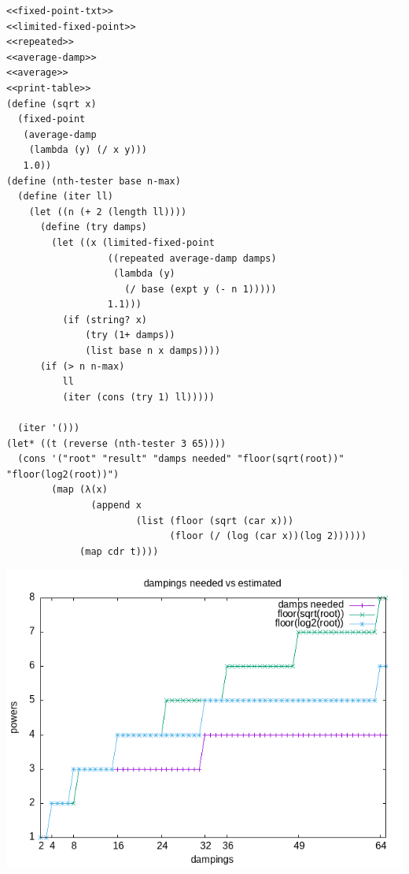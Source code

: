 \documentclass[final,fleqn,titlepage]{article}
\begin{document}
\begin{verbatim}
<<fixed-point-txt>>
<<limited-fixed-point>>
<<repeated>>
<<average-damp>>
<<average>>
<<print-table>>
(define (sqrt x)
  (fixed-point
   (average-damp
    (lambda (y) (/ x y)))
   1.0))
(define (nth-tester base n-max)
  (define (iter ll)
    (let ((n (+ 2 (length ll))))
      (define (try damps)
        (let ((x (limited-fixed-point
                  ((repeated average-damp damps)
                   (lambda (y)
                     (/ base (expt y (- n 1)))))
                  1.1)))
          (if (string? x)
              (try (1+ damps))
              (list base n x damps))))
      (if (> n n-max)
          ll
          (iter (cons (try 1) ll)))))

  (iter '()))
(let* ((t (reverse (nth-tester 3 65))))
  (cons '("root" "result" "damps needed" "floor(sqrt(root))" "floor(log2(root))")
        (map (λ(x)
               (append x
                       (list (floor (sqrt (car x)))
                             (floor (/ (log (car x))(log 2))))))
             (map cdr t))))
\end{verbatim}

\begin{center}
\includegraphics[width=.9\linewidth]{fig/1-45-1.png}
\end{center}
\end{document}
